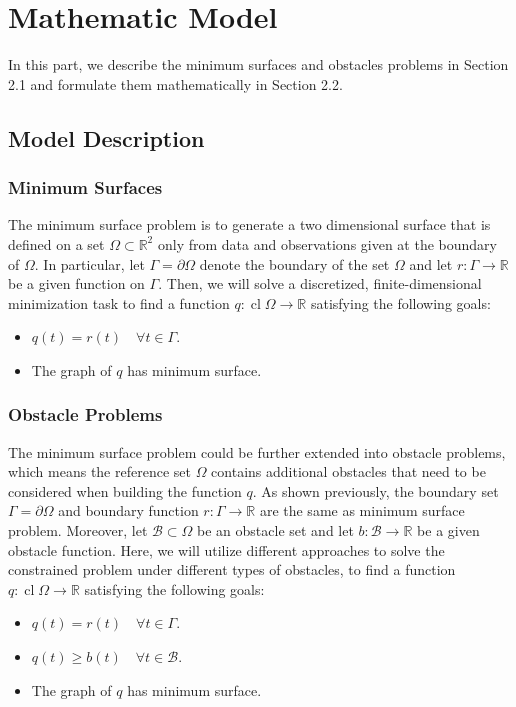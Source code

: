 \section{Mathematic Model}
In this part, we describe the minimum surfaces and obstacles problems in Section 2.1 and formulate them mathematically in Section 2.2.
\subsection{Model Description}
\subsubsection{Minimum Surfaces}
The minimum surface problem is to generate a two dimensional surface that is defined on a set $\Omega \subset \mathbb{R}^{2}$ only from data and observations given at the boundary of $\Omega.$ In particular, let $\Gamma=\partial \Omega$ denote the boundary of the set $\Omega$ and let $r: \Gamma \rightarrow \mathbb{R}$ be a given function on $\Gamma .$ Then, we will solve a discretized, finite-dimensional minimization task to find a function $q: \operatorname{cl} \Omega \rightarrow \mathbb{R}$ satisfying the following goals:

\begin{itemize}
    \item $ q(t)=r(t) \quad \forall t \in \Gamma$.
    \item The graph of $q$ has minimum surface.
\end{itemize}
\subsubsection{Obstacle Problems}
The minimum surface problem could be further extended into obstacle problems, which means the reference set $\Omega$ contains additional obstacles that need to be considered when building the function $q$. As shown previously, the boundary set $\Gamma=\partial \Omega$ and boundary function $r: \Gamma \rightarrow \mathbb{R}$ are the same as minimum surface problem. Moreover, let $\mathcal{B} \subset \Omega$ be an obstacle set and let $b: \mathcal{B} \rightarrow \mathbb{R}$ be a given obstacle function. Here, we will utilize different approaches to solve the constrained problem under different types of obstacles, to find a function $q: \operatorname{cl} \Omega \rightarrow \mathbb{R}$ satisfying the following goals:
\begin{itemize}
  \item $ q(t)=r(t) \quad \forall t \in \Gamma$. 
  \item $ q(t) \geq b(t) \quad \forall t \in \mathcal{B} $.
  \item The graph of $q$ has minimum surface.
\end{itemize}



